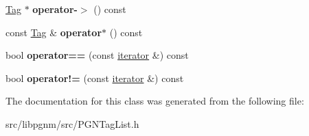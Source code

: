 \begin{DoxyCompactItemize}
\item 
\hypertarget{classpgn_1_1TagList_1_1iterator_a3498a4bf6bf90f673da05387db181921}{
\hyperlink{classpgn_1_1Tag}{Tag} $\ast$ {\bfseries operator-\/$>$} () const }
\label{classpgn_1_1TagList_1_1iterator_a3498a4bf6bf90f673da05387db181921}

\item 
\hypertarget{classpgn_1_1TagList_1_1iterator_afc167531276b3f8ad75efd7484169596}{
const \hyperlink{classpgn_1_1Tag}{Tag} \& {\bfseries operator$\ast$} () const }
\label{classpgn_1_1TagList_1_1iterator_afc167531276b3f8ad75efd7484169596}

\item 
\hypertarget{classpgn_1_1TagList_1_1iterator_ab569fc7d7d24af664bb0e533264c9342}{
bool {\bfseries operator==} (const \hyperlink{classpgn_1_1TagList_1_1iterator}{iterator} \&) const }
\label{classpgn_1_1TagList_1_1iterator_ab569fc7d7d24af664bb0e533264c9342}

\item 
\hypertarget{classpgn_1_1TagList_1_1iterator_a1c62ef962f35a95d4b2045413e949842}{
bool {\bfseries operator!=} (const \hyperlink{classpgn_1_1TagList_1_1iterator}{iterator} \&) const }
\label{classpgn_1_1TagList_1_1iterator_a1c62ef962f35a95d4b2045413e949842}

\end{DoxyCompactItemize}


The documentation for this class was generated from the following file:\begin{DoxyCompactItemize}
\item 
src/libpgnm/src/PGNTagList.h\end{DoxyCompactItemize}
